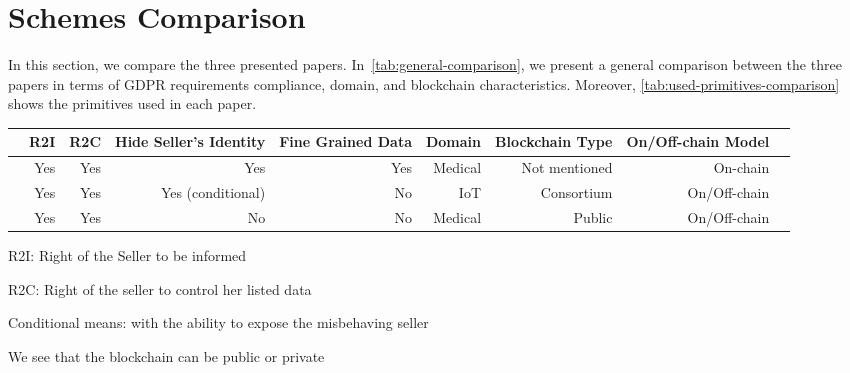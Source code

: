 \section{Schemes Comparison}
\label{sec:schemes-comparison}

In this section, we compare the three presented papers.
In~\cref{tab:general-comparison}, we present a general comparison between 
the three papers in terms of GDPR requirements compliance, domain, and blockchain characteristics.
Moreover, \cref{tab:used-primitives-comparison} shows the primitives used in each paper.

\begin{table*}[h!]\centering
\caption{General schemes comparison}\label{tab:general-comparison}
\scriptsize
\begin{threeparttable}
\begin{tabular}{lrrrrrrrr}\toprule
&R2I\tnote{1} &R2C\tnote{2} &Hide Seller's Identity &Fine Grained Data &Domain &Blockchain Type &On/Off-chain Model \\\midrule
\cite{xue2023blockchain} &Yes &Yes &Yes &Yes &Medical &Not mentioned\tnote{4} &On-chain \\
\cite{liu2022blockchain} &Yes &Yes &Yes (conditional)\tnote{3} &No &IoT &Consortium &On/Off-chain \\
\cite{alsharif2020blockchain} &Yes &Yes &No &No &Medical &Public &On/Off-chain \\
\bottomrule
\end{tabular}
\begin{tablenotes}
    \item[1] R2I: Right of the Seller to be informed
    \item[2] R2C: Right of the seller to control her listed data
    \item[3] Conditional means: with the ability to expose the misbehaving seller
    \item[4] We see that the blockchain can be public or private
\end{tablenotes}
\end{threeparttable}
\end{table*}

